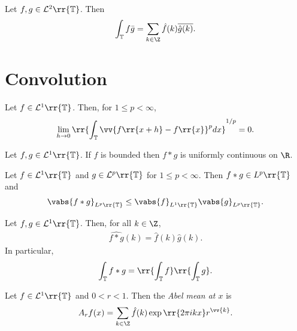 \documentclass{article}
\begin{document}
\begin{corollary}[Parseval]
  Let $f,g\in\mathcal L^2\rr{\mathbb T}$. Then
  \begin{align*}
    \int_{\mathbb T}f\bar g = \sum_{k\in\Z} \hat f(k)\overline{\hat g(k)}.
  \end{align*}
\end{corollary}

\section{Convolution}

\begin{lemma}
  Let $f\in\mathcal L^1\rr{\mathbb T}$. Then, for $1\leq p<\infty$,
  \begin{align*}
    \lim_{h\to 0}\rr{\int_{\mathbb T} \vv{f\rr{x+h}-f\rr{x}}^p dx}^{1/p} = 0.
  \end{align*}
\end{lemma}

\begin{proposition}
  Let $f,g\in\mathcal L^1\rr{\mathbb T}$. If $f$ is bounded then $f*g$
  is uniformly continuous on $\R$.
\end{proposition}

\begin{theorem}
  Let $f\in\mathcal L^1\rr{\mathbb T}$ and $g\in\mathcal L^p\rr{\mathbb T}$ for $1\leq p<\infty$.
  Then $f*g\in L^p\rr{\mathbb T}$ and
  \begin{align*}
    \vabs{f*g}_{L^p\rr{\mathbb T}} \leq \vabs{f}_{L^1\rr{\mathbb T}}\vabs{g}_{L^p\rr{\mathbb T}}.
  \end{align*}
\end{theorem}

\begin{proposition}
  Let $f,g\in\mathcal L^1\rr{\mathbb T}$. Then, for all $k\in\Z$,
  \begin{align*}
    \widehat{f*g}(k) = \hat f(k)\hat g(k).
  \end{align*}
  In particular,
  \begin{align*}
    \int_{\mathbb T}f*g = \rr{\int_{\mathbb T} f}\rr{\int_{\mathbb T}g}.
  \end{align*}
\end{proposition}

\begin{definition}
  Let $f\in\mathcal L^1\rr{\mathbb T}$ and $0<r<1$. Then the \emph{Abel mean at $x$}
  is
  \begin{align*}
    A_r f(x) = \sum_{k\in\Z} \hat f(k)\exp\rr{2\pi ikx}r^{\vv{k}}.
  \end{align*}
\end{definition}
\end{document}
